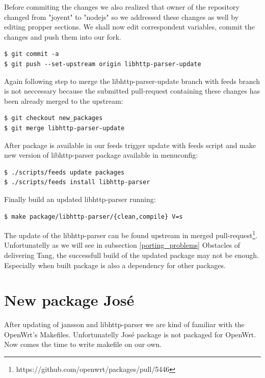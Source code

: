 Before commiting the changes we also realized that owner of the repository changed from "joyent" to "nodejs" so we addressed these changes as well by editing propper sections.
We shall now edit correspondent variables, commit the changes and push them into our fork.
\begin{lstlisting}[columns=fixed,basicstyle=\ttfamily\footnotesize,tabsize=4,backgroundcolor=\color{yellow!10}]
$ git commit -a
$ git push --set-upstream origin libhttp-parser-update
\end{lstlisting}
Again following step to merge the libhttp-parser-update branch with feeds branch is not neccessary because the submitted pull-request containing these changes has been already merged to the upstream:
\begin{lstlisting}[columns=fixed,basicstyle=\ttfamily\footnotesize,tabsize=4,backgroundcolor=\color{yellow!10}]
$ git checkout new_packages
$ git merge libhttp-parser-update
\end{lstlisting}
After package is available in our feeds trigger update with feeds script and make new version of libhttp-parser package available in menuconfig:
\begin{lstlisting}[columns=fixed,basicstyle=\ttfamily\footnotesize,tabsize=4,backgroundcolor=\color{yellow!10}]
$ ./scripts/feeds update packages
$ ./scripts/feeds install libhttp-parser
\end{lstlisting}
Finally build an updated libhttp-parser running:
\begin{lstlisting}[columns=fixed,basicstyle=\ttfamily\footnotesize,tabsize=4,backgroundcolor=\color{yellow!10}]
$ make package/libhttp-parser/{clean,compile} V=s
\end{lstlisting}
The update of the libhttp-parser can be found upstream in merged pull-request\footnote{https://github.com/openwrt/packages/pull/5446}.
Unfortunatelly as we will see in subsection \ref{porting_problems} Obstacles of delivering Tang, the successfull build of the updated package may not be enough.
Especially when built package is also a dependency for other packages.



\section{New package José}

After updating of jansson and libhttp-parser we are kind of familiar with the OpenWrt's Makefiles.
Unfortunatelly José package is not packaged for OpenWrt.
Now comes the time to write makefile on our own.

